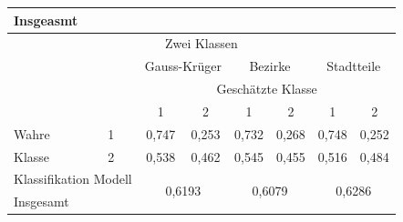 \documentclass{Vorlage}
\begin{document}
\begin{table}[h]
\begin{tabular}{lcccccccccc}
\multicolumn{2}{l|}{Insgeasmt}                                                                    & \multicolumn{3}{c|}{}                        & \multicolumn{3}{c|}{}                        & \multicolumn{3}{c}{}                   \\ \hline
\multicolumn{11}{c}{Zwei Klassen}                                                                                                                                                                                                        \\ \hline
                                                                         & \multicolumn{1}{l|}{}  & \multicolumn{3}{c|}{Gauss-Krüger}             & \multicolumn{3}{c|}{Bezirke}                  & \multicolumn{3}{c}{Stadtteile}         \\ \cline{3-11} 
                                                                         & \multicolumn{1}{l|}{}  & \multicolumn{9}{c}{Geschätzte Klasse}                                                                                                \\
                                                                         & \multicolumn{1}{l|}{}  & 1       & \multicolumn{2}{c|}{2}             & 1       & \multicolumn{2}{c|}{2}             & 1           & \multicolumn{2}{c}{2}    \\ \hline
Wahre                                                                    & \multicolumn{1}{l|}{1} & 0,747   & \multicolumn{2}{c|}{0,253}         & 0,732   & \multicolumn{2}{c|}{0,268}         & 0,748         & \multicolumn{2}{c}{0,252}    \\
Klasse                                                                   & \multicolumn{1}{l|}{2} & 0,538   & \multicolumn{2}{c|}{0,462}         & 0,545   & \multicolumn{2}{c|}{0,455}         & 0,516       & \multicolumn{2}{c}{0,484}    \\ \hline
\multicolumn{2}{l|}{Klassifikation Modell}                                                        & \multicolumn{3}{c|}{\multirow{2}{*}{0,6193}} & \multicolumn{3}{c|}{\multirow{2}{*}{0,6079}} & \multicolumn{3}{c}{\multirow{2}{*}{0,6286}} \\
\multicolumn{2}{l|}{Insgesamt}                                                                    & \multicolumn{3}{c|}{}                        & \multicolumn{3}{c|}{}                        & \multicolumn{3}{c}{}                   \\ \hline \hline
\end{tabular}
\end{table}
\end{document}
